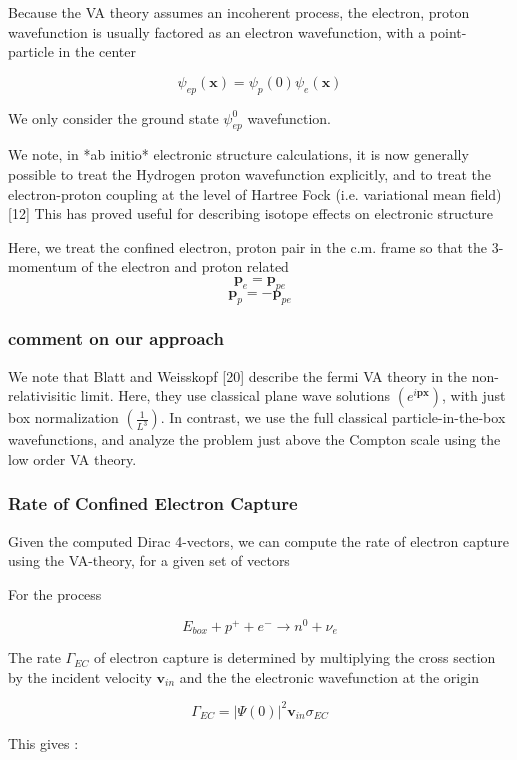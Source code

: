 \documentclass[11pt]{amsart}
\begin{document}
Because the VA theory assumes an incoherent process, the electron, proton wavefunction is usually factored as an electron wavefunction, with a point-particle in the center

$$\psi_{ep}(\mathbf{x})=\psi_{p}(0)\psi_{e}(\mathbf{x})$$

We only consider the  ground state $\psi_{ep}^{0}$ wavefunction.


We note, in *ab initio* electronic structure calculations, it is now generally possible to treat the Hydrogen proton wavefunction explicitly, and to treat the electron-proton coupling at the level of Hartree Fock (i.e. variational mean field) [12] This has proved useful for describing isotope effects on electronic structure

Here, we treat the confined electron, proton pair in the c.m. frame so that the 3-momentum of the electron and proton related
$$\mathbf{p}_{e}=\mathbf{p}_{pe}$$
$$\mathbf{p}_{p}=-\mathbf{p}_{pe}$$

\subsubsection{comment on our approach}

We note that Blatt and Weisskopf [20] describe the fermi VA theory in the non-relativisitic limit.  Here, they use classical plane wave solutions $(e^{i\mathbf{p}\mathbf{x}})$, with just box normalization $(\frac{1}{L^{3}})$.  In contrast, we use the full classical particle-in-the-box wavefunctions, and analyze the problem just above the Compton scale using the low order VA theory.

\subsubsection{Rate of Confined Electron Capture}

Given the computed Dirac 4-vectors, we can compute the rate of electron capture using the VA-theory, for a given set of vectors

For the process

$$E_{box}+p^{+}+e^{-}\rightarrow n^{0}+\nu_{e}$$

The rate $\Gamma_{EC}$ of electron capture is determined by multiplying the cross section by the incident velocity $\mathbf{v}_{in}$ and the the electronic wavefunction at the origin 

$$\Gamma_{EC}=\big\vert\Psi(0)\big\vert^{2}\mathbf{v}_{in}\sigma_{EC}$$

This gives :
\end{document}
